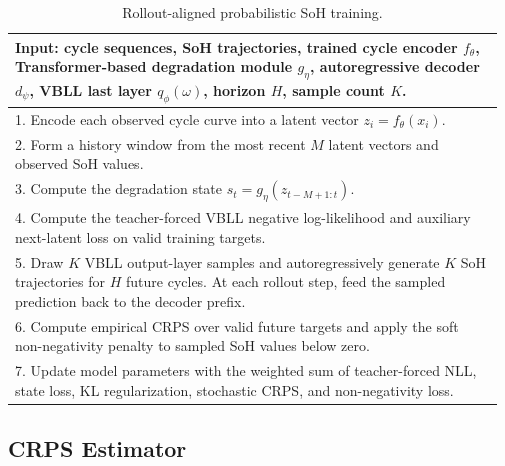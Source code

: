 \documentclass[conference]{IEEEtran}
\begin{document}
\begin{table}[h]
\centering
\scriptsize
\caption{Rollout-aligned probabilistic SoH training.}
\label{alg:rollout-training}
\begin{tabular}{@{}p{0.97\linewidth}@{}}
\toprule
\textbf{Input:} cycle sequences, SoH trajectories, trained cycle encoder
$f_\theta$, Transformer-based degradation module $g_\eta$, autoregressive decoder
$d_\psi$, VBLL last layer $q_\phi(\omega)$, horizon $H$, sample count $K$. \\
\midrule
1. Encode each observed cycle curve into a latent vector
$z_i=f_\theta(x_i)$. \\
2. Form a history window from the most recent $M$ latent vectors and observed
SoH values. \\
3. Compute the degradation state $s_t=g_\eta(z_{t-M+1:t})$. \\
4. Compute the teacher-forced VBLL negative log-likelihood and auxiliary
next-latent loss on valid training targets. \\
5. Draw $K$ VBLL output-layer samples and autoregressively generate $K$ SoH
trajectories for $H$ future cycles. At each rollout step, feed the sampled
prediction back to the decoder prefix. \\
6. Compute empirical CRPS over valid future targets and apply the soft
non-negativity penalty to sampled SoH values below zero. \\
7. Update model parameters with the weighted sum of teacher-forced NLL,
state loss, KL regularization, stochastic CRPS, and non-negativity loss. \\
\bottomrule
\end{tabular}
\end{table}

\subsection{CRPS Estimator}
\end{document}
